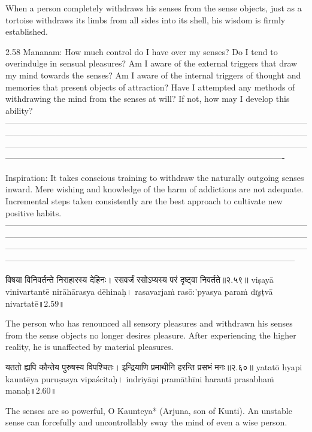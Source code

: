 When a person completely withdraws his senses from the sense objects, just as a tortoise withdraws its limbs from all sides into its shell,  his wisdom is firmly established.

2.58 Mananam:
How much control do I have over my senses? Do I tend to overindulge in sensual pleasures? Am I aware of the external triggers that draw my mind towards the senses? Am I aware of the internal triggers of thought and memories that present objects of attraction? Have I attempted any methods of withdrawing the mind from the senses at will? If not, how may I develop this ability?
—-------------------------------------------------------------------------------------------------------------------------------------------------------------------------------------------------------------------------------------------------------------------------------------------------------------------------------------------------------------------------------------------------------------------------------------

Inspiration:
It takes conscious training to withdraw the naturally outgoing senses inward. Mere wishing and knowledge of the harm of addictions are not adequate. Incremental steps taken consistently are the best approach to cultivate new positive habits.
—-----------------------------------------------------------------------------------------------------------------------------------------------------------------------------------------------------------------------------------------------------------------------------------------------------------------------------------------------------------------------------------------------------------------------------------------



विषया विनिवर्तन्ते निराहारस्य देहिनः।
 रसवर्जं रसोऽप्यस्य परं दृष्ट्वा निवर्तते॥२.५९॥
viṣayā vinivartantē nirāhārasya dēhinaḥ।
rasavarjaṁ rasō:'pyasya paraṁ dr̥ṣṭvā nivartatē॥2.59॥

The person who has renounced all sensory pleasures and withdrawn his senses from the sense objects no longer desires pleasure. After experiencing the higher reality, he is unaffected by material pleasures.


यततो ह्यपि कौन्तेय पुरुषस्य विपश्चितः। 
इन्द्रियाणि प्रमाथीनि हरन्ति प्रसभं मनः॥२.६०॥
yatatō hyapi kauntēya puruṣasya vipaścitaḥ। 
indriyāṇi pramāthīni haranti prasabhaṁ manaḥ॥2.60॥

The senses are so powerful, O Kaunteya* (Arjuna, son of Kunti). An unstable sense can forcefully and uncontrollably sway the mind of even a wise person.


